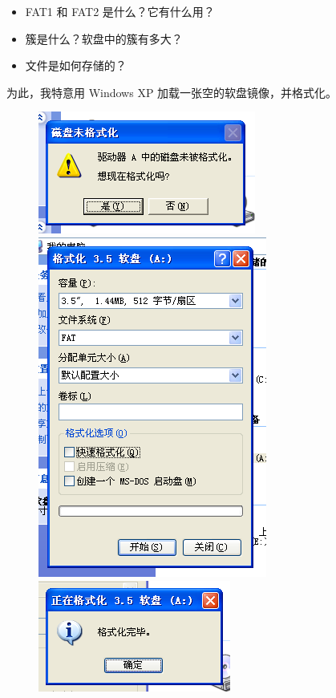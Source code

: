 \documentclass[a4paper]{article}
\begin{document}
\begin{itemize}
\item FAT1 和 FAT2 是什么？它有什么用？
\item 簇是什么？软盘中的簇有多大？
\item 文件是如何存储的？
\end{itemize}

为此，我特意用 Windows XP 加载一张空的软盘镜像，并格式化。

\newpage

\begin{figure}[!hbp]
\centering
\includegraphics[scale=0.5]{pics/1.png}
\includegraphics[scale=0.5]{pics/2.png}
\includegraphics[scale=0.5]{pics/3.png}
\end{figure}
\end{document}
